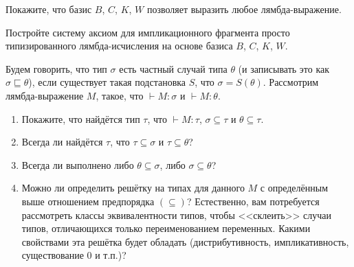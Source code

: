 \documentclass[10pt,a4paper,oneside]{article}
\begin{document}
\item Покажите, что базис $B$, $C$, $K$, $W$ позволяет выразить любое лямбда-выражение.
\item Постройте систему аксиом для импликационного фрагмента просто типизированного лямбда-исчисления на основе
базиса $B$, $C$, $K$, $W$.
\item Будем говорить, что тип $\sigma$ есть частный случай типа $\theta$ (и записывать это как
$\sigma \sqsubseteq \theta$), если существует такая подстановка $S$, что $\sigma = S(\theta)$.
Рассмотрим лямбда-выражение $M$, такое, что $\vdash M: \sigma$ и $\vdash M: \theta$.
\begin{enumerate}
\item Покажите, что найдётся тип $\tau$, что $\vdash M:\tau$, $\sigma\subseteq\tau$ и $\theta\subseteq\tau$.
\item Всегда ли найдётся $\tau$, что $\tau \subseteq \sigma$ и $\tau \subseteq \theta$?
\item Всегда ли выполнено либо $\theta \subseteq \sigma$, либо $\sigma \subseteq \theta$?
\item Можно ли определить решётку на типах для данного $M$ с определённым выше отношением предпорядка $(\subseteq)$?
Естественно, вам потребуется рассмотреть классы эквивалентности типов, чтобы <<склеить>> случаи 
типов, отличающихся только переименованием переменных.
Какими свойствами эта решётка будет обладать (дистрибутивность, импликативность, существование 0 и т.п.)?
\end{enumerate}
\end{document}

